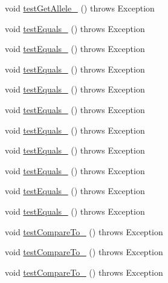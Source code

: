 \begin{DoxyCompactItemize}
void \hyperlink{classorg_1_1jgap_1_1impl_1_1_string_gene_test_a2d82e8673ce7638ee88b4cb0098efc56}{test\-Get\-Allele\-\_} ()  throws Exception 
\item 
void \hyperlink{classorg_1_1jgap_1_1impl_1_1_string_gene_test_a70775bd4d18cb1cb0a39dd6f9f938fbd}{test\-Equals\-\_} ()  throws Exception 
\item 
void \hyperlink{classorg_1_1jgap_1_1impl_1_1_string_gene_test_a21457b14e0250bff6edf14eb77c9c26c}{test\-Equals\-\_} ()  throws Exception 
\item 
void \hyperlink{classorg_1_1jgap_1_1impl_1_1_string_gene_test_abb34be44b20654ac4cff1eee3bf6e124}{test\-Equals\-\_} ()  throws Exception 
\item 
void \hyperlink{classorg_1_1jgap_1_1impl_1_1_string_gene_test_acf93b39dfdfd975b21079221cef1c889}{test\-Equals\-\_} ()  throws Exception 
\item 
void \hyperlink{classorg_1_1jgap_1_1impl_1_1_string_gene_test_a14a9c02ddd88c928aa00806f4c4c9bb1}{test\-Equals\-\_} ()  throws Exception 
\item 
void \hyperlink{classorg_1_1jgap_1_1impl_1_1_string_gene_test_a753ebaf36b0a22b383fb103de28c99cd}{test\-Equals\-\_} ()  throws Exception 
\item 
void \hyperlink{classorg_1_1jgap_1_1impl_1_1_string_gene_test_ad2ac0dc6a08b3fb507713fce4b3b96a7}{test\-Equals\-\_} ()  throws Exception 
\item 
void \hyperlink{classorg_1_1jgap_1_1impl_1_1_string_gene_test_a4dd9e54850d2e7b2b175b4b8d2489d97}{test\-Equals\-\_} ()  throws Exception 
\item 
void \hyperlink{classorg_1_1jgap_1_1impl_1_1_string_gene_test_a58545b4f314a3239cfab51aac4533837}{test\-Equals\-\_} ()  throws Exception 
\item 
void \hyperlink{classorg_1_1jgap_1_1impl_1_1_string_gene_test_a585e165b8034285216705cb986913b38}{test\-Equals\-\_} ()  throws Exception 
\item 
void \hyperlink{classorg_1_1jgap_1_1impl_1_1_string_gene_test_a2bf5cb8663615c515d760bd35ea8897d}{test\-Compare\-To\-\_} ()  throws Exception 
\item 
void \hyperlink{classorg_1_1jgap_1_1impl_1_1_string_gene_test_a16cf7e3cd56b3b61c2e3c0ab6096dfa3}{test\-Compare\-To\-\_} ()  throws Exception 
\item 
void \hyperlink{classorg_1_1jgap_1_1impl_1_1_string_gene_test_a68fb0660f5ea541755ed67b3786050d1}{test\-Compare\-To\-\_} ()  throws Exception 
\item 

\end{DoxyCompactItemize}
